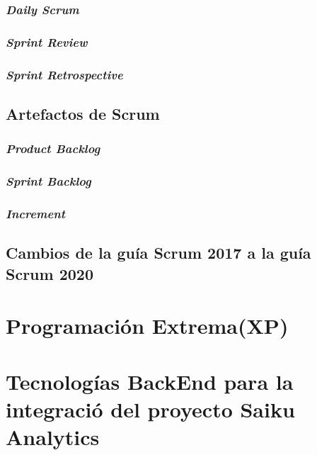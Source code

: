 		\subsubsection{\textit{Daily Scrum}}
		\subsubsection{\textit{Sprint Review}}
		\subsubsection{\textit{Sprint Retrospective}}
	\subsection{Artefactos de Scrum}
		\subsubsection{\textit{Product Backlog}}
		\subsubsection{\textit{Sprint Backlog}}
		\subsubsection{\textit{Increment}}
	\subsection{Cambios de la gu\'{i}a Scrum 2017 a la gu\'{i}a Scrum 2020}
\section{Programaci\'{o}n Extrema(XP)}
		\lipsum[1-2]
\section{Tecnolog\'{i}as BackEnd para la integraci\'{o} del proyecto Saiku Analytics}
		\lipsum[1-2]
